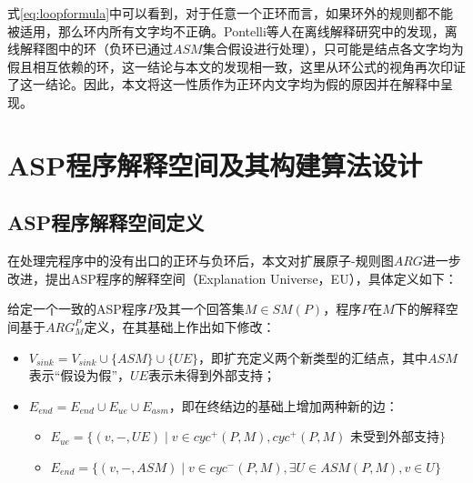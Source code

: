式\eqref{eq:loopformula}中可以看到，对于任意一个正环而言，如果环外的规则都不能被适用，那么环内所有文字均不正确。Pontelli等人在离线解释研究中的发现，离线解释图中的环（负环已通过$ASM$集合假设进行处理），只可能是结点各文字均为假且相互依赖的环\cite{pontelli2009justifications}，这一结论与本文的发现相一致，这里从环公式的视角再次印证了这一结论。因此，本文将这一性质作为正环内文字均为假的原因并在解释中呈现。

\section{ASP程序解释空间及其构建算法设计}
\subsection{ASP程序解释空间定义}
在处理完程序中的没有出口的正环与负环后，本文对扩展原子-规则图$ARG$进一步改进，提出ASP程序的解释空间（Explanation Universe，EU），具体定义如下：
\begin{definition}[ASP程序解释空间]
    给定一个一致的ASP程序$P$及其一个回答集$M \in SM(P)$，程序$P$在$M$下的解释空间基于$ARG^P_M$定义，在其基础上作出如下修改：
    \begin{itemize}[topsep=0pt]
        \setlength\itemsep{-0.3em}
        \item $V_{sink} = V_{sink} \cup \{ASM\} \cup \{UE\}$，即扩充定义两个新类型的汇结点，其中$ASM$表示“假设为假”，$UE$表示未得到外部支持；
        \item $E_{end} = E_{end} \cup E_{ue} \cup E_{asm}$，即在终结边的基础上增加两种新的边：
        \begin{itemize}[topsep=0pt,label=$\circ$]
            \setlength\itemsep{-0.3em}
            \item $E_{ue} = \{(v, -, UE) \mid v \in cyc^+(P, M), cyc^+(P, M)\text{ 未受到外部支持}\}$
            \item $E_{end} = \{(v, -, ASM) \mid v \in cyc^-(P, M), \exists U \in ASM(P, M), v \in U\}$
        \end{itemize}
    \end{itemize}
\end{definition}


